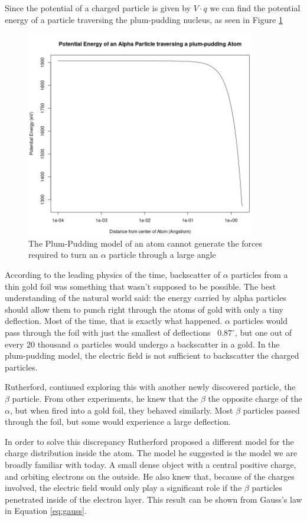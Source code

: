 \documentclass[12pt]{article}
\begin{document}
Since the potential of a charged particle is given by $V\cdot{q}$ we can find the potential energy of a particle traversing the plum-pudding nucleus, as seen in Figure \ref{fig:plumenergy}

\begin{figure}
    \centering
    \includegraphics[width=10cm]{plumenergy}
    \caption{The Plum-Pudding model of an atom cannot generate the forces required to turn an $\alpha$ particle through a large angle}
    \label{fig:plumenergy}
\end{figure}


According to the leading physics of the time, backscatter of $\alpha$ particles from a thin gold foil was something that wasn't supposed to be possible.
The best understanding of the natural world said: the energy carried by alpha particles should allow them to punch right through the atoms of gold with only a tiny deflection.
Most of the time, that is exactly what happened.
$\alpha$ particles would pass through the foil with just the smallest of deflections ~$0.87^\circ$, but one out of every 20 thousand $\alpha$ particles would undergo a backscatter in a gold\cite{Rutherford1911}.
In the plum-pudding model, the electric field is not sufficient to backscatter the charged particles.

Rutherford, continued exploring this with another newly discovered particle, the $\beta$ particle.
From other experiments, he knew that the $\beta$ the opposite charge of the $\alpha$, but when fired into a gold foil, they behaved similarly.
Most $\beta$ particles passed through the foil, but some would experience a large deflection.


In order to solve this discrepancy Rutherford proposed a different model for the charge distribution inside the atom. 
The model he suggested is the model we are broadly familiar with today. A small dense object with a central positive charge, and orbiting electrons on the outside.
He also knew that, because of the charges involved, the electric field would only play a significant role if the $\beta$ particles penetrated inside of the electron layer. 
This result can be shown from Gauss's law in Equation \ref{eq:gauss}.
\end{document}
